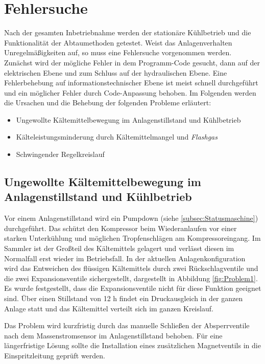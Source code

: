 \section{Fehlersuche}
\label{sec:Fehlersuche}

Nach der gesamten Inbetriebnahme werden der stationäre Kühlbetrieb und  die Funktionalität der Abtaumethoden getestet. Weist das Anlagenverhalten Unregelmäßigkeiten auf, so muss eine Fehlersuche vorgenommen werden. Zunächst wird der mögliche Fehler in dem Programm-Code gesucht, dann auf der elektrischen Ebene und zum Schluss auf der hydraulischen Ebene. Eine Fehlerbehebung auf informationstechnischer Ebene ist meist schnell durchgeführt und ein möglicher Fehler durch Code-Anpassung behoben. 
Im Folgenden werden die Ursachen und die Behebung der folgenden Probleme erläutert:

\begin{itemize}
\item	Ungewollte Kältemittelbewegung im Anlagenstillstand und Kühlbetrieb
\item	Kälteleistungsminderung durch Kältemittelmangel und \textit{Flashgas}
\item 	Schwingender Regelkreislauf
\end{itemize}

\subsection*{Ungewollte Kältemittelbewegung im Anlagenstillstand und Kühlbetrieb}

Vor einem Anlagenstillstand wird ein Pumpdown (siehe \ref{subsec:Statusmaschine}) durchgeführt. Das schützt den Kompressor beim Wiederanlaufen vor einer starken Unterkühlung und möglichen Tropfenschlägen am Kompressoreingang. Im Sammler ist der Großteil des Kältemittels gelagert und verlässt diesen im Normalfall erst wieder im Betriebsfall. In der aktuellen Anlagenkonfiguration wird das Entweichen des flüssigen Kältemittels durch zwei Rückschlagventile und die zwei Expansionsventile sichergestellt, dargestellt in Abbildung \ref{fig:Problem1}. Es wurde festgestellt, dass die Expansionsventile nicht für diese Funktion geeignet sind. Über einen Stillstand von 12 h findet ein Druckausgleich in der ganzen Anlage statt und das Kältemittel verteilt sich im ganzen Kreislauf.

Das Problem wird kurzfristig durch das manuelle Schließen der Absperrventile nach dem Massenstromsensor im Anlagenstillstand behoben. Für eine längerfristige Lösung sollte die Installation eines zusätzlichen Magnetventils in die Einspritzleitung geprüft werden. 

